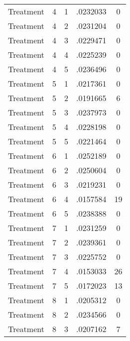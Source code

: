 \begin{tabular}{l*{4}{c}}
Treatment           &           4&           1&    .0232033&           0\\
Treatment           &           4&           2&    .0231204&           0\\
Treatment           &           4&           3&    .0229471&           0\\
Treatment           &           4&           4&    .0225239&           0\\
Treatment           &           4&           5&    .0236496&           0\\
Treatment           &           5&           1&    .0217361&           0\\
Treatment           &           5&           2&    .0191665&           6\\
Treatment           &           5&           3&    .0237973&           0\\
Treatment           &           5&           4&    .0228198&           0\\
Treatment           &           5&           5&    .0221464&           0\\
Treatment           &           6&           1&    .0252189&           0\\
Treatment           &           6&           2&    .0250604&           0\\
Treatment           &           6&           3&    .0219231&           0\\
Treatment           &           6&           4&    .0157584&          19\\
Treatment           &           6&           5&    .0238388&           0\\
Treatment           &           7&           1&    .0231259&           0\\
Treatment           &           7&           2&    .0239361&           0\\
Treatment           &           7&           3&    .0225752&           0\\
Treatment           &           7&           4&    .0153033&          26\\
Treatment           &           7&           5&    .0172023&          13\\
Treatment           &           8&           1&    .0205312&           0\\
Treatment           &           8&           2&    .0234566&           0\\
Treatment           &           8&           3&    .0207162&           7\\

\end{tabular}
